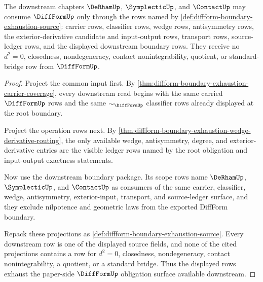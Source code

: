 \begin{theorem}
\label{thm:diffform-boundary-exhaustion-downstream-export}
The downstream chapters $\DeRhamUp$, $\SymplecticUp$, and $\ContactUp$ may
consume $\DiffFormUp$ only through the rows named by
\autoref{def:diffform-boundary-exhaustion-source}: carrier rows, classifier
rows, wedge rows, antisymmetry rows, the exterior-derivative candidate and
input-output rows, transport rows, source-ledger rows, and the displayed
downstream boundary rows. They receive no $d^2=0$, closedness,
nondegeneracy, contact nonintegrability, quotient, or standard-bridge row
from $\DiffFormUp$.
\end{theorem}
\begin{proof}
Project the common input first. By
\autoref{thm:diffform-boundary-exhaustion-carrier-coverage}, every downstream
read begins with the same carried $\DiffFormUp$ rows and the same
$\sim_{\DiffFormUp}$ classifier rows already displayed at the root boundary.

Project the operation rows next. By
\autoref{thm:diffform-boundary-exhaustion-wedge-derivative-routing}, the only
available wedge, antisymmetry, degree, and exterior-derivative entries are the
visible ledger rows named by the root obligation and input-output exactness
statements.

Now use the downstream boundary package. Its scope rows name $\DeRhamUp$,
$\SymplecticUp$, and $\ContactUp$ as consumers of the same carrier,
classifier, wedge, antisymmetry, exterior-input, transport, and source-ledger
surface, and they exclude nilpotence and geometric laws from the exported
DiffForm boundary.

Repack these projections as
\autoref{def:diffform-boundary-exhaustion-source}. Every downstream row is one
of the displayed source fields, and none of the cited projections contains a
row for $d^2=0$, closedness, nondegeneracy, contact nonintegrability, a
quotient, or a standard bridge. Thus the displayed rows exhaust the
paper-side $\DiffFormUp$ obligation surface available downstream.
\end{proof}

